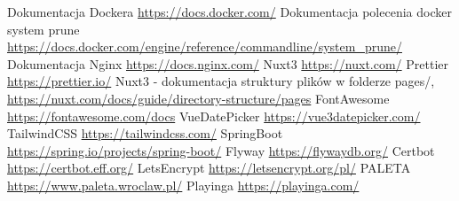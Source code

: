 \documentclass[shortabstract]{iithesis}
\begin{document}
\label{subsec:Certbot}


\begin{thebibliography}{1}
     Dokumentacja Dockera \url{https://docs.docker.com/}
     Dokumentacja polecenia docker system prune \url{https://docs.docker.com/engine/reference/commandline/system_prune/}
     Dokumentacja Nginx \url{https://docs.nginx.com/}
     Nuxt3 \url{https://nuxt.com/}
     Prettier \url{https://prettier.io/}
     Nuxt3 - dokumentacja struktury plików w folderze pages/, \url{https://nuxt.com/docs/guide/directory-structure/pages}
     FontAwesome \url{https://fontawesome.com/docs}
     VueDatePicker \url{https://vue3datepicker.com/}
     TailwindCSS \url{https://tailwindcss.com/}
     SpringBoot \url{https://spring.io/projects/spring-boot/}
     Flyway \url{https://flywaydb.org/}
     Certbot \url{https://certbot.eff.org/}
     LetsEncrypt \url{https://letsencrypt.org/pl/}
     PALETA \url{https://www.paleta.wroclaw.pl/}
     Playinga \url{https://playinga.com/}
\end{thebibliography}
\end{document}
